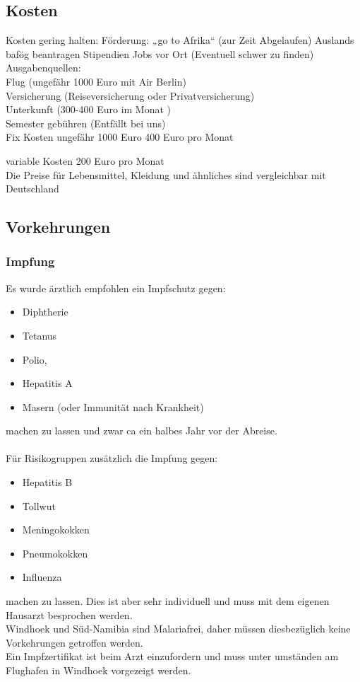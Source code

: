 \documentclass[11pt]{article}
\begin{document}
\subsection{Kosten}
Kosten gering halten:
Förderung: „go to Afrika“ (zur Zeit Abgelaufen)
Auslands bafög beantragen
Stipendien
Jobs vor Ort (Eventuell schwer zu finden)\\

Ausgabenquellen:\\
Flug (ungefähr 1000 Euro mit Air Berlin)\\
Versicherung (Reiseversicherung oder Privatversicherung)\\
Unterkunft (300-400 Euro im Monat )\\
Semester gebühren (Entfällt bei uns)\\

Fix Kosten 		ungefähr 1000 Euro
			400 Euro pro Monat

variable Kosten 	200 Euro pro Monat\\

Die Preise für Lebensmittel, Kleidung und ähnliches sind vergleichbar mit Deutschland

\subsection{Vorkehrungen}

\subsubsection{Impfung}
Es wurde ärztlich empfohlen ein Impfschutz gegen:
\begin{itemize}
\item Diphtherie
\item Tetanus
\item Polio,
\item Hepatitis A
\item Masern (oder Immunität nach Krankheit)
\end{itemize}
machen zu lassen und zwar ca ein halbes Jahr vor der 
Abreise. \\\\
Für Risikogruppen zusätzlich die Impfung gegen:
\begin{itemize}
\item Hepatitis B
\item Tollwut
\item Meningokokken
\item Pneumokokken
\item Influenza
\end{itemize}
 machen zu lassen. Dies ist aber sehr individuell und muss mit dem eigenen Hausarzt besprochen werden.
\\
Windhoek und Süd-Namibia sind Malariafrei, daher müssen diesbezüglich keine Vorkehrungen getroffen werden. 
\\
Ein Impfzertifikat ist beim Arzt einzufordern und muss unter umständen am Flughafen in Windhoek vorgezeigt werden.
\end{document}
